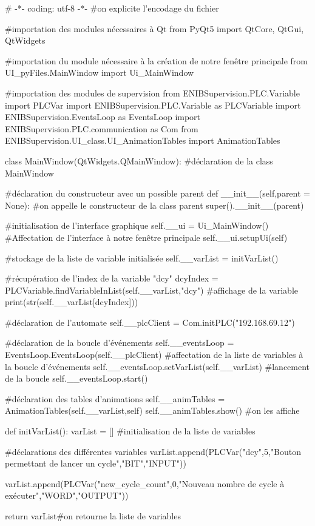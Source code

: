 \documentclass[12pt]{report}    %
\begin{document}
\begin{pyCode}
# -*- coding: utf-8 -*-
#on explicite l’encodage du fichier

#importation des modules nécessaires à Qt
from PyQt5 import QtCore, QtGui, QtWidgets

#importation du module nécessaire à la création de notre fenêtre principale
from UI_pyFiles.MainWindow import Ui_MainWindow

#importation des modules de supervision
from ENIBSupervision.PLC.Variable import PLCVar
import ENIBSupervision.PLC.Variable as PLCVariable
import ENIBSupervision.EventsLoop as EventsLoop
import ENIBSupervision.PLC.communication as Com
from ENIBSupervision.UI_class.UI_AnimationTables import AnimationTables

class MainWindow(QtWidgets.QMainWindow): #déclaration de la class MainWindow

	#déclaration du constructeur avec un possible parent
	def __init__(self,parent = None):
		#on appelle le constructeur de la class parent
		super().__init__(parent)

		#initialisation de l'interface graphique
		self.__ui = Ui_MainWindow()
		#Affectation de l'interface à notre fenêtre principale
		self.__ui.setupUi(self)

		#stockage de la liste de variable initialisée
		self.__varList = initVarList()

		#récupération de l'index de la variable "dcy"
		dcyIndex = PLCVariable.findVariableInList(self.__varList,"dcy")
		#affichage de la variable
		print(str(self.__varList[dcyIndex]))

		#déclaration de l'automate
		self.__plcClient = Com.initPLC("192.168.69.12")
		

		#déclaration de la boucle d'événements
		self.__eventsLoop = EventsLoop.EventsLoop(self.__plcClient)
		#affectation de la liste de variables à la boucle d'événements
		self.__eventsLoop.setVarList(self.__varList)
		#lancement de la boucle
		self.__eventsLoop.start()


		#déclaration des tables d'animations
		self.__animTables = AnimationTables(self.__varList,self)
		self.__animTables.show() #on les affiche





def initVarList():
	varList = [] #initialisation de la liste de variables

	#déclarations des différentes variables
	varList.append(PLCVar("dcy",5,"Bouton permettant de lancer un cycle","BIT","INPUT"))

	varList.append(PLCVar("new_cycle_count",0,"Nouveau nombre de cycle à exécuter","WORD","OUTPUT"))

	return varList#on retourne la liste de variables
\end{pyCode}



\end{document}
